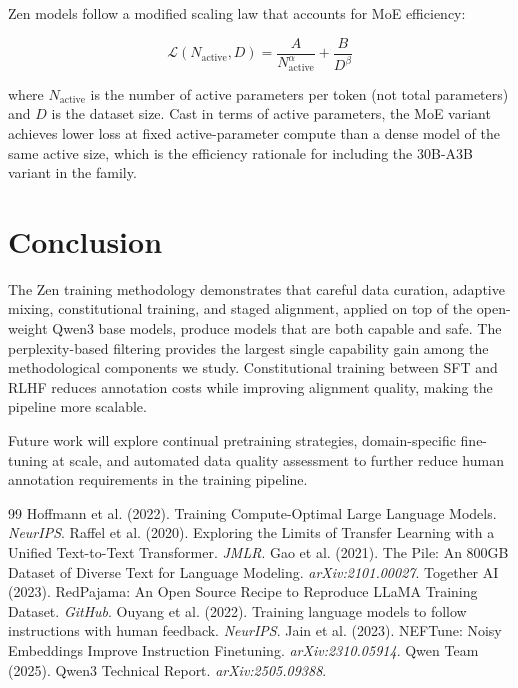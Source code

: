 \documentclass[11pt,a4paper]{article}
\begin{document}
Zen models follow a modified scaling law that accounts for MoE efficiency:

\begin{equation}
\mathcal{L}(N_\text{active}, D) = \frac{A}{N_\text{active}^\alpha} + \frac{B}{D^\beta}
\end{equation}

where $N_\text{active}$ is the number of active parameters per token (not total
parameters) and $D$ is the dataset size. Cast in terms of active parameters, the MoE
variant achieves lower loss at fixed active-parameter compute than a dense model of the
same active size, which is the efficiency rationale for including the 30B-A3B variant in
the family.

\section{Conclusion}

The Zen training methodology demonstrates that careful data curation, adaptive mixing,
constitutional training, and staged alignment, applied on top of the open-weight Qwen3
base models, produce models that are both capable and safe. The perplexity-based
filtering provides the largest single capability gain among the methodological components
we study. Constitutional training between SFT and RLHF reduces annotation costs while
improving alignment quality, making the pipeline more scalable.

Future work will explore continual pretraining strategies, domain-specific fine-tuning
at scale, and automated data quality assessment to further reduce human annotation
requirements in the training pipeline.


\begin{thebibliography}{99}
 Hoffmann et al. (2022). Training Compute-Optimal Large Language Models. \textit{NeurIPS}.
 Raffel et al. (2020). Exploring the Limits of Transfer Learning with a Unified Text-to-Text Transformer. \textit{JMLR}.
 Gao et al. (2021). The Pile: An 800GB Dataset of Diverse Text for Language Modeling. \textit{arXiv:2101.00027}.
 Together AI (2023). RedPajama: An Open Source Recipe to Reproduce LLaMA Training Dataset. \textit{GitHub}.
 Ouyang et al. (2022). Training language models to follow instructions with human feedback. \textit{NeurIPS}.
 Jain et al. (2023). NEFTune: Noisy Embeddings Improve Instruction Finetuning. \textit{arXiv:2310.05914}.
 Qwen Team (2025). Qwen3 Technical Report. \textit{arXiv:2505.09388}.
\end{thebibliography}
\end{document}
